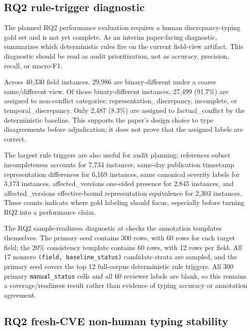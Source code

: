 \subsection{RQ2 rule-trigger diagnostic}

The planned RQ2 performance evaluation requires a human discrepancy-typing gold set and is not yet complete. As an interim paper-facing diagnostic,  summarizes which deterministic rules fire on the current field-view artifact. This diagnostic should be read as audit prioritization, not as accuracy, precision, recall, or macro-F1.

Across 40,330 field instances, 29,986 are binary-different under a coarse same/different view. Of those binary-different instances, 27,499 (91.7\%) are assigned to non-conflict categories: representation\_discrepancy, incomplete, or temporal\_discrepancy. Only 2,487 (8.3\%) are assigned to factual\_conflict by the deterministic baseline. This supports the paper's design choice to type disagreements before adjudication; it does not prove that the assigned labels are correct.

The largest rule triggers are also useful for audit planning: references subset incompleteness accounts for 7,734 instances, same-day publication timestamp representation differences for 6,169 instances, same canonical severity labels for 3,173 instances, affected\_versions one-sided presence for 2,845 instances, and affected\_versions effective-bound representation equivalence for 2,303 instances. These counts indicate where gold labeling should focus, especially before turning RQ2 into a performance claim.

The RQ2 sample-readiness diagnostic at  checks the annotation templates themselves. The primary seed contains 300 rows, with 60 rows for each target field; the 20\% consistency template contains 60 rows, with 12 rows per field. All 17 nonzero \texttt{(field, baseline\_status)} candidate strata are sampled, and the primary seed covers the top 12 full-corpus deterministic rule triggers. All 300 primary \texttt{manual\_status} cells and all 60 reviewer labels are blank, so this remains a coverage/readiness result rather than evidence of typing accuracy or annotation agreement.

\subsection{RQ2 fresh-CVE non-human typing stability}

